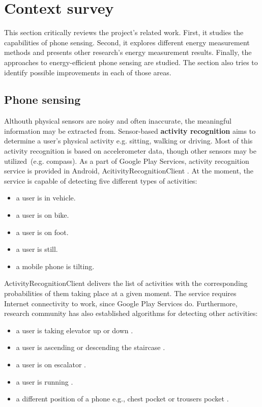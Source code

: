 \section{Context survey}
\label{s:contextsurvey}
\hspace{10pt} This section critically reviews the project's related work. First, it studies the capabilities of phone sensing. Second, it explores different energy measurement methods and presents other research's energy measurement results. Finally, the approaches to energy-efficient phone sensing are studied. The section also tries to identify possible improvements in each of those areas. 

\subsection{Phone sensing}

Althouth physical sensors are noisy and often inaccurate, the meaningful information may be extracted from. \hspace{10pt} Sensor-based \textbf{activity recognition} aims to determine a user's physical activity e.g. sitting, walking or driving. Most of this activity recognition is based on accelerometer data, though other sensors may be utilized\ (e.g. compass). As a part of Google Play Services, activity recognition service is provided in Android, AcitivityRecognitionClient \cite{android:activityrecognition}. At the moment, the service is capable of detecting five different types of activities: 
 \begin{itemize}
  	\item a user is in vehicle.
    \item a user is on bike.
    \item a user is on foot.
    \item a user is still.
    \item a mobile phone is tilting.
  \end{itemize}
  
ActivityRecognitionClient delivers the list of activities with the corresponding probabilities of them taking place at a given moment. The service requires Internet connectivity to work, since Google Play Services do. Furthermore, research community has also established algorithms for detecting other activities:
 \begin{itemize}
  	\item a user is taking elevator up or down \cite{Wang:unsupervised}.
    \item a user is ascending or descending the staircase \cite{Wang:unsupervised}.
    \item a user is on escalator \cite{Wang:unsupervised}.
    \item a user is running \cite{miluzzo:cenceme}.
    \item a different position of a phone e.g., chest pocket or trousers pocket \cite{kawahara:positions}.
  \end{itemize}

